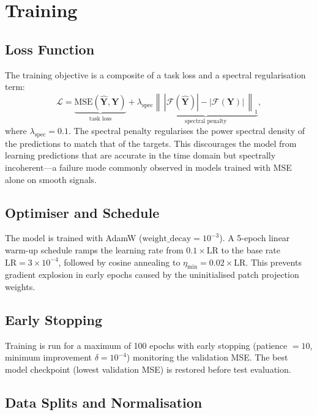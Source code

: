 \documentclass[11pt, letterpaper]{article}
\begin{document}
\section{Training}
\label{sec:training}

\subsection{Loss Function}

The training objective is a composite of a task loss and a spectral regularisation term:
\[
  \mathcal{L} = \underbrace{\text{MSE}(\hat{\mathbf{Y}}, \mathbf{Y})}_{\text{task loss}} + \lambda_\text{spec}\underbrace{\left\|\,|\mathcal{F}(\hat{\mathbf{Y}})| - |\mathcal{F}(\mathbf{Y})|\,\right\|_1}_{\text{spectral penalty}},
\]
where $\lambda_\text{spec} = 0.1$. The spectral penalty regularises the power spectral density of the predictions to match that of the targets. This discourages the model from learning predictions that are accurate in the time domain but spectrally incoherent—a failure mode commonly observed in models trained with MSE alone on smooth signals.

\subsection{Optimiser and Schedule}

The model is trained with AdamW ($\text{weight\_decay} = 10^{-3}$). A 5-epoch linear warm-up schedule ramps the learning rate from $0.1 \times \text{LR}$ to the base rate $\text{LR} = 3 \times 10^{-4}$, followed by cosine annealing to $\eta_\text{min} = 0.02 \times \text{LR}$. This prevents gradient explosion in early epochs caused by the uninitialised patch projection weights.

\subsection{Early Stopping}

Training is run for a maximum of 100 epochs with early stopping (patience $= 10$, minimum improvement $\delta = 10^{-4}$) monitoring the validation MSE. The best model checkpoint (lowest validation MSE) is restored before test evaluation.

\subsection{Data Splits and Normalisation}
\end{document}
